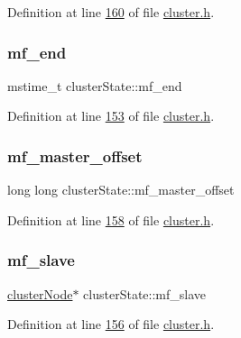 Definition at line \hyperlink{cluster_8h_source_l00160}{160} of file \hyperlink{cluster_8h_source}{cluster.\+h}.

\mbox{\label{structclusterState_af3ea36bbd489586bc9fcd1a006657f72}} 
\subsubsection{\texorpdfstring{mf\+\_\+end}{mf\_end}}
{\footnotesize\ttfamily mstime\+\_\+t cluster\+State\+::mf\+\_\+end}



Definition at line \hyperlink{cluster_8h_source_l00153}{153} of file \hyperlink{cluster_8h_source}{cluster.\+h}.

\mbox{\label{structclusterState_ad5b4da4752c6da732602b3dd858a9977}} 
\subsubsection{\texorpdfstring{mf\+\_\+master\+\_\+offset}{mf\_master\_offset}}
{\footnotesize\ttfamily long long cluster\+State\+::mf\+\_\+master\+\_\+offset}



Definition at line \hyperlink{cluster_8h_source_l00158}{158} of file \hyperlink{cluster_8h_source}{cluster.\+h}.

\mbox{\label{structclusterState_aa5e779b422ba935a084af8242ee7526a}} 
\subsubsection{\texorpdfstring{mf\+\_\+slave}{mf\_slave}}
{\footnotesize\ttfamily \hyperlink{structclusterNode}{cluster\+Node}$\ast$ cluster\+State\+::mf\+\_\+slave}



Definition at line \hyperlink{cluster_8h_source_l00156}{156} of file \hyperlink{cluster_8h_source}{cluster.\+h}.

